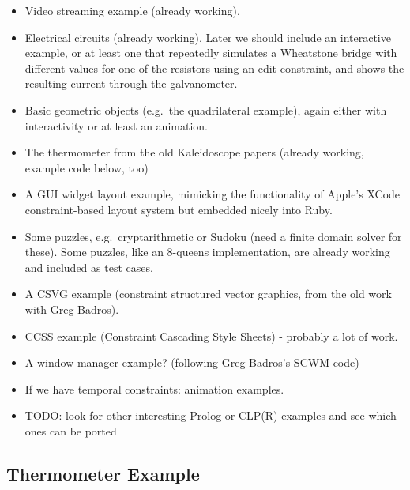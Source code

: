 \documentclass[11pt]{article}
\begin{document}
\begin{itemize}

\item Video streaming example (already working).

\item Electrical circuits (already working).  Later we should include
  an interactive example, or at least one that repeatedly simulates a
  Wheatstone bridge with different values for one of the resistors
  using an edit constraint, and shows the resulting current through the
  galvanometer.

\item Basic geometric objects (e.g.\ the quadrilateral example), again
  either with interactivity or at least an animation.

\item The thermometer from the old Kaleidoscope papers (already
  working, example code below, too)

\item A GUI widget layout example, mimicking the functionality of Apple's
  XCode constraint-based layout system but embedded nicely into Ruby.

\item Some puzzles, e.g.\ cryptarithmetic or Sudoku (need a finite
  domain solver for these). Some puzzles, like an 8-queens
  implementation, are already working and included as test cases.

\item A CSVG example (constraint structured vector graphics, from the
  old work with Greg Badros).

\item CCSS example (Constraint Cascading Style Sheets) - probably a
  lot of work.

\item A window manager example?  (following Greg Badros's SCWM code)

\item If we have temporal constraints: animation examples.

\item TODO: look for other interesting Prolog or CLP(R) examples and
  see which ones can be ported

\end{itemize}

\subsection{Thermometer Example}
\label{sec:thermometer-example}
\end{document}
